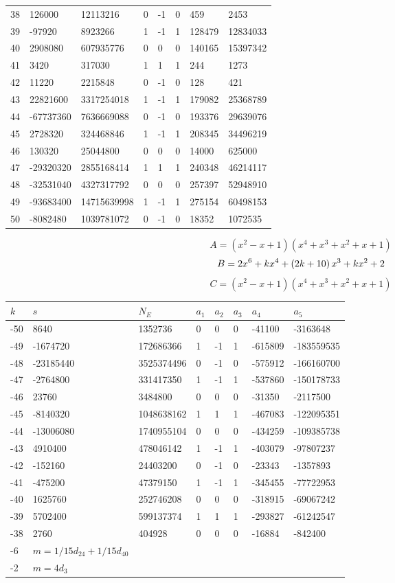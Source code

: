 \documentclass{amsart}
\begin{document}
\begin{longtable}{|l|l|l|lllll|}
38&126000&12113216&0&-1&0&459&2453\\
39&-97920&8923266&1&-1&1&128479&12834033\\
40&2908080&607935776&0&0&0&140165&15397342\\
41&3420&317030&1&1&1&244&1273\\
42&11220&2215848&0&-1&0&128&421\\
43&22821600&3317254018&1&-1&1&179082&25368789\\
44&-67737360&7636669088&0&-1&0&193376&29639076\\
45&2728320&324468846&1&-1&1&208345&34496219\\
46&130320&25044800&0&0&0&14000&625000\\
47&-29320320&2855168414&1&1&1&240348&46214117\\
48&-32531040&4327317792&0&0&0&257397&52948910\\
49&-93683400&14715639998&1&-1&1&275154&60498153\\
50&-8082480&1039781072&0&-1&0&18352&1072535\\
\hline
\end{longtable}
$$A=(x^2
 - x
 + 1)(x^4
 + x^3
 + x^2
 + x
 + 1)$$
$$B=2\*x^6
 + k\*x^4
 + \left(2\*k
 + 10\right) \*x^3
 + k\*x^2
 + 2$$
$$C=(x^2
 - x
 + 1)(x^4
 + x^3
 + x^2
 + x
 + 1)$$
\begin{longtable}{|l|l|l|lllll|}
\hline
$k$ & $s$ & $N_E$ & $a_1$ & $a_2$ & $a_3$ & $a_4$ & $a_5$\\
\hline
-50&8640&1352736&0&0&0&-41100&-3163648\\
-49&-1674720&172686366&1&-1&1&-615809&-183559535\\
-48&-23185440&3525374496&0&-1&0&-575912&-166160700\\
-47&-2764800&331417350&1&-1&1&-537860&-150178733\\
-46&23760&3484800&0&0&0&-31350&-2117500\\
-45&-8140320&1048638162&1&1&1&-467083&-122095351\\
-44&-13006080&1740955104&0&0&0&-434259&-109385738\\
-43&4910400&478046142&1&-1&1&-403079&-97807237\\
-42&-152160&24403200&0&-1&0&-23343&-1357893\\
-41&-475200&47379150&1&-1&1&-345455&-77722953\\
-40&1625760&252746208&0&0&0&-318915&-69067242\\
-39&5702400&599137374&1&1&1&-293827&-61242547\\
-38&2760&404928&0&0&0&-16884&-842400\\
-6&$m=1/15d_{24}+1/15d_{40}$&&\multicolumn{5}{c|}{}\\
-2&$m=4d_{3}$&&\multicolumn{5}{c|}{}\\
\hline
\end{longtable}
\end{document}
